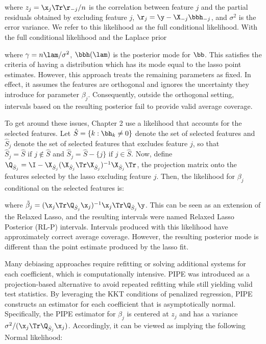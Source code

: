 \noindent where $z_j = \x_j \Tr\r_{-j} / n$ is the correlation between feature $j$ and the partial residuals obtained by excluding feature $j$, $\r_j = \y - \X_{-j}\bbh_{-j}$, and $\sigma^2$ is the error variance. We refer to this likelihood as the full conditional likelihood. With the full conditional likelihood and the Laplace prior

\noindent where $\gamma = n\lam / \sigma^2$, $\bbh(\lam)$ is the posterior mode for $\bb$. This satisfies the criteria of having a distribution which has its mode equal to the lasso point estimates. However, this approach treats the remaining parameters as fixed. In effect, it assumes the features are orthogonal and ignores the uncertainty they introduce for parameter $\beta_j$. Consequently, outside the orthogonal setting, intervals based on the resulting posterior fail to provide valid average coverage. 

To get around these issues, Chapter 2 use a likelihood that accounts for the selected features. Let $\hat{S} = \lbrace k: \bh_k \neq  0 \rbrace$ denote the set of selected features and $\hat{S}_j$ denote the set of selected features that excludes feature $j$, so that $\hat{S}_j = \hat{S} \text{ if } j \notin \hat{S}$ and $\hat{S}_j = \hat{S} - \lbrace j \rbrace \text{ if } j \in \hat{S}$. Now, define $\Q_{\hat{S}_j} = \I - \X_{\hat{S}_j}(\X_{\hat{S}_j} \Tr \X_{\hat{S}_j})^{-1} \X_{\hat{S}_j} \Tr$, the projection matrix onto the features selected by the lasso excluding feature $j$. Then, the likelihood for $\beta_j$ conditional on the selected features is: 

\noindent where $\tilde{\beta}_j = (\x_j \Tr \Q_{\hat{S}_j} \x_j)^{-1} \x_j \Tr \Q_{\hat{S}_j} \y$.  This can be seen as an extension of the Relaxed Lasso, and the resulting intervals were named Relaxed Lasso Posterior (RL-P) intervals. Intervals produced with this likelihood have approximately correct average coverage. However, the resulting posterior mode is different than the point estimate produced by the lasso fit.

Many debiasing approaches require refitting or solving additional systems for each coefficient, which is computationally intensive. PIPE \citep{dai2019} was introduced as a projection-based alternative to avoid repeated refitting while still yielding valid test statistics. By leveraging the KKT conditions of penalized regression, PIPE constructs an estimator for each coefficient that is asymptotically normal. Specifically, the PIPE estimator for $\beta_j$ is centered at $z_j$ and has a variance $\sigma^2/ (\x_j \Tr \Q_{\hat{S}_j} \x_j)$. Accordingly, it can be viewed as implying the following Normal likelihood:

